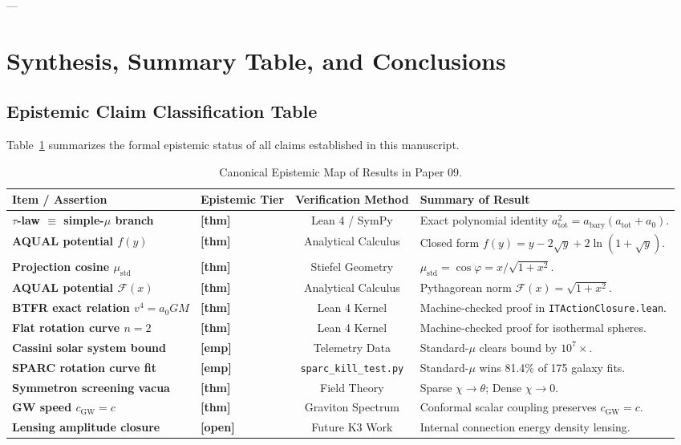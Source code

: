 \documentclass[11pt,a4paper]{article}
\theoremstyle{definition}
\begin{document}
---

\section{Synthesis, Summary Table, and Conclusions}

\subsection{Epistemic Claim Classification Table}
Table~\ref{tab:claim_summary} summarizes the formal epistemic status of all claims established in this manuscript.

\begin{table}[h!]
\centering
\small
\begin{tabular}{@{}>{\bfseries}l l c p{6.5cm}@{}}
\toprule
Item / Assertion & Epistemic Tier & Verification Method & Summary of Result \\
\midrule
$\tau$-law $\equiv$ simple-$\mu$ branch & \color{gold}\textbf{[thm]} & Lean 4 / SymPy & Exact polynomial identity $a_{\text{tot}}^2 = a_{\text{bary}}(a_{\text{tot}}+a_0)$. \\
AQUAL potential $f(y)$ & \color{gold}\textbf{[thm]} & Analytical Calculus & Closed form $f(y) = y - 2\sqrt{y} + 2\ln(1+\sqrt{y})$. \\
Projection cosine $\mu_{\text{std}}$ & \color{gold}\textbf{[thm]} & Stiefel Geometry & $\mu_{\text{std}} = \cos\varphi = x/\sqrt{1+x^2}$. \\
AQUAL potential $\mathcal{F}(x)$ & \color{gold}\textbf{[thm]} & Analytical Calculus & Pythagorean norm $\mathcal{F}(x) = \sqrt{1+x^2}$. \\
BTFR exact relation $v^4 = a_0 GM$ & \color{gold}\textbf{[thm]} & Lean 4 Kernel & Machine-checked proof in \texttt{ITActionClosure.lean}. \\
Flat rotation curve $n=2$ & \color{gold}\textbf{[thm]} & Lean 4 Kernel & Machine-checked proof for isothermal spheres. \\
Cassini solar system bound & \color{cyan}\textbf{[emp]} & Telemetry Data & Standard-$\mu$ clears bound by $10^7\times$. \\
SPARC rotation curve fit & \color{cyan}\textbf{[emp]} & \texttt{sparc\_kill\_test.py} & Standard-$\mu$ wins 81.4\% of 175 galaxy fits. \\
Symmetron screening vacua & \color{gold}\textbf{[thm]} & Field Theory & Sparse $\chi \to \theta$; Dense $\chi \to 0$. \\
GW speed $c_{\text{GW}} = c$ & \color{gold}\textbf{[thm]} & Graviton Spectrum & Conformal scalar coupling preserves $c_{\text{GW}}=c$. \\
Lensing amplitude closure & \color{accentred}\textbf{[open]} & Future K3 Work & Internal connection energy density lensing. \\
\bottomrule
\end{tabular}
\caption{Canonical Epistemic Map of Results in Paper 09.}
\label{tab:claim_summary}
\end{table}
\end{document}

